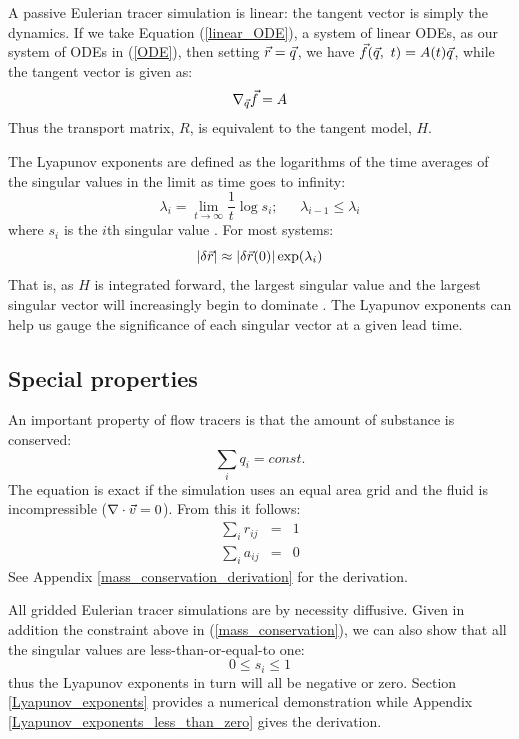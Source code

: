 A passive Eulerian tracer simulation is linear: the tangent vector is simply
the dynamics.
If we take Equation (\ref{linear_ODE}), a system of linear ODEs,
as our system of ODEs in
(\ref{ODE}), then setting $\vec r=\vec q$, 
we have $\vec f(\vec q, ~t)=A(t) \vec q$,
while the tangent vector is given as:
\begin{equation}
	\nabla_{\vec q} \vec f = A
\end{equation}
Thus the transport matrix, $R$, is equivalent to the tangent model, $H$.

The Lyapunov exponents are defined as the logarithms of the time averages
of the singular values in the limit as time goes to infinity:
\begin{equation}
\lambda_i = \lim_{t \rightarrow \infty} \frac{1}{t} \log s_i;
~~~~~~~\lambda_{i-1} \le \lambda_i
\end{equation}
where $s_i$ is the $i$th singular value \citep{Ott1993}.
For most systems:
\begin{equation}
|\delta \vec r| \approx |\delta \vec r(0) | \exp(\lambda_i)
\label{lambda1}
\end{equation}
That is, as $H$ is integrated forward, the largest singular value and
the largest singular vector will increasingly begin to dominate
\citep{Ott1993}.
The Lyapunov exponents can help us gauge the significance of each
singular vector at a given lead time.

\subsection{Special properties}

An important property of flow tracers is that the amount of substance is 
conserved:
\begin{equation}
\sum_i q_i = const.
\label{mass_conservation}
\end{equation}
The equation is exact if the simulation uses an equal area grid
and the fluid is incompressible ($\nabla \cdot \vec v=0$).
From this it follows:
\begin{eqnarray}
\sum_i r_{ij} & = & 1 
\label{columns_sum_to_one}\\
\sum_i a_{ij} & = & 0
\label{columns_sum_to_zero}
\end{eqnarray}
See Appendix \ref{mass_conservation_derivation} for the derivation.

All gridded Eulerian tracer simulations are by necessity diffusive. 
Given in addition the constraint above in (\ref{mass_conservation}),
we can also show that all the singular values are less-than-or-equal-to one:
\begin{equation}
	0 \le s_i \le 1
	\label{sv_lt_one}
\end{equation}
thus the Lyapunov exponents in turn will all be negative or zero.
Section \ref{Lyapunov_exponents} provides a numerical demonstration while 
Appendix \ref{Lyapunov_exponents_less_than_zero} gives the derivation.


